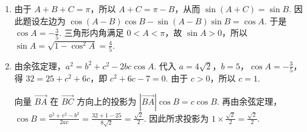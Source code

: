 \begin{solution}
\begin{enumerate}
\item 由于 \(A+B+C=\pi\)，所以 \(A+C=\pi-B\)，从而 \(\sin(A+C)=\sin B\). 因此题设左边为
\(\cos(A-B)\cos B-\sin(A-B)\sin B=\cos A\). 于是 \(\cos A=-\frac35\). 三角形内角满足 \(0<A<\pi\)，故 \(\sin A>0\)，所以 \(\sin A=\sqrt{1-\cos^2A}=\frac45\).

\item 由余弦定理，\(a^2=b^2+c^2-2bc\cos A\). 代入 \(a=4\sqrt2\)，\(b=5\)，\(\cos A=-\frac35\)，得
\(32=25+c^2+6c\)，即 \(c^2+6c-7=0\). 由于 \(c>0\)，所以 \(c=1\).

向量 \(\overrightarrow{BA}\) 在 \(\overrightarrow{BC}\) 方向上的投影为 \(|\overrightarrow{BA}|\cos B=c\cos B\). 再由余弦定理，\(\cos B=\frac{a^2+c^2-b^2}{2ac}=\frac{32+1-25}{8\sqrt2}=\frac{\sqrt2}{2}\). 因此所求投影为 \(1\times\frac{\sqrt2}{2}=\frac{\sqrt2}{2}\).
\end{enumerate}
\end{solution}

